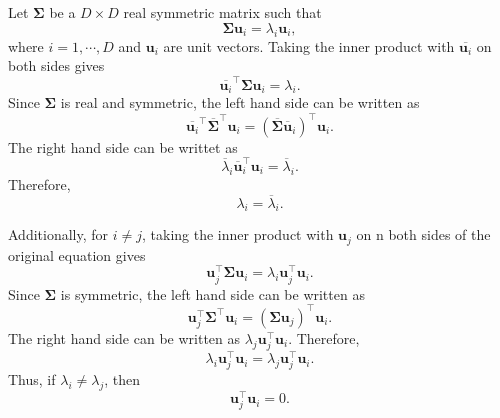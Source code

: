 \subsection{}
\label{2.18}
Let $\bm{\Sigma}$ be a $D \times D$ real symmetric matrix such that
%
\begin{equation}
\bm{\Sigma} 
\mathbf{u}_i 
= 
\lambda_i 
\mathbf{u}_i,
\end{equation}
%
where $i = 1, \cdots, D$ and $\mathbf{u}_i$ are unit vectors.
Taking the inner product with $\overline{\mathbf{u}_i}$ on both sides gives
%
\begin{equation}
\overline{\mathbf{u}_i} ^ \intercal 
\bm{\Sigma} 
\mathbf{u}_i
= 
\lambda_i.
\end{equation}
%
Since $\bm{\Sigma}$ is real and symmetric, the left hand side can be written as
%
\begin{equation}
\overline{\mathbf{u}_i} ^ \intercal 
\overline{\bm{\Sigma}} ^ \intercal 
\mathbf{u}_i
= 
\left( 
	\overline{\bm{\Sigma}} 
	\overline{\mathbf{u}}_i 
\right) ^ \intercal 
\mathbf{u}_i.
\end{equation}
%
The right hand side can be writtet as
%
\begin{equation}
\overline{\lambda}_i \overline{\mathbf{u}}_i ^ \intercal \mathbf{u}_i
= \overline{\lambda}_i.
\end{equation}
%
Therefore,
%
\begin{equation}
\lambda_i 
= 
\overline{\lambda}_i.
\end{equation}
%

Additionally, for $i \neq j$, taking the inner product with $\mathbf{u}_j$ on n both sides of the original equation gives
%
\begin{equation}
\mathbf{u}_j ^ \intercal 
\bm{\Sigma} 
\mathbf{u}_i
= 
\lambda_i 
\mathbf{u}_j ^ \intercal 
\mathbf{u}_i.
\end{equation}
%
Since $\bm{\Sigma}$ is symmetric, the left hand side can be written as
%
\begin{equation}
\mathbf{u}_j ^ \intercal 
\bm{\Sigma} ^ \intercal 
\mathbf{u}_i
= 
\left( 
	\bm{\Sigma} 
	\mathbf{u}_j 
\right) ^ \intercal 
\mathbf{u}_i.
\end{equation}
%
The right hand side can be written as $\lambda_j \mathbf{u}_j ^ \intercal \mathbf{u}_i$.
Therefore,
%
\begin{equation}
\lambda_i 
\mathbf{u}_j ^ \intercal 
\mathbf{u}_i
= 
\lambda_j 
\mathbf{u}_j ^ \intercal 
\mathbf{u}_i.
\end{equation}
%
Thus, if $\lambda_i \neq \lambda_j$, then
%
\begin{equation}
\mathbf{u}_j ^ \intercal 
\mathbf{u}_i 
= 
0.
\end{equation}
%


